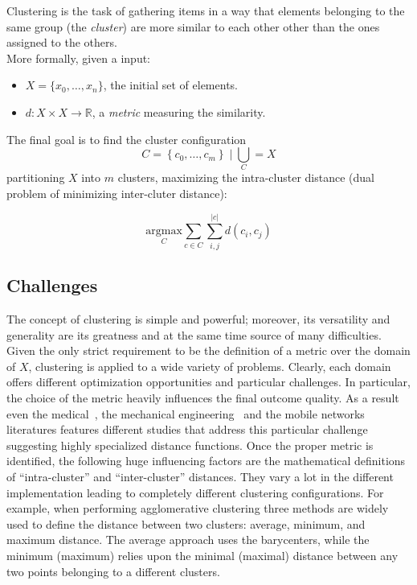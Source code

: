 \label{problem_definition}
Clustering is the task of gathering items in a way that elements belonging
to the same group (the \emph{cluster}) are more similar to each other other than the ones
assigned to the others.\\
More formally, given a input:
\begin{itemize}
    \item $X = \{x_0, \dots ,x_n\}$, the initial set of elements.
    \item $d: X \times X \to \mathbb{R}$, a \emph{metric} measuring the similarity.
\end{itemize}
The final goal is to find the cluster configuration
\begin{equation*}
    C = \left\{ c_0, \dots , c_m \right\} \mid \bigcup_{C} = X
\end{equation*}
partitioning $X$ into $m$ clusters, maximizing the intra-cluster distance
(dual problem of minimizing inter-cluter distance):

\begin{equation}
    \underset{C}{\mathrm{argmax}}
    \sum_{c \in C}
        \sum_{i,j}^{|c|}
            d(c_i,c_j)
\end{equation}


\subsection*{Challenges}
The concept of clustering is simple and powerful; moreover, its versatility
and generality are its greatness and at the same time source of many difficulties.
Given the only strict requirement to be the definition of a metric over the
domain of $X$, clustering is applied to a wide variety of problems.
Clearly, each domain offers different optimization opportunities and
particular challenges.
In particular, the choice of the metric heavily influences the final outcome quality.
As a result even the medical~\cite{siless2013comparison}, the mechanical
engineering~\cite{wilding2011clustering} and the mobile networks~\cite{cheng2009stability}
literatures features different studies that address this particular challenge
suggesting highly specialized distance functions.
Once the proper metric is identified, the following huge influencing factors
are the mathematical definitions of ``intra-cluster'' and ``inter-cluster''
distances. They vary a lot in the different implementation leading to
completely different clustering configurations.
For example, when performing agglomerative clustering three methods
are widely used to define the distance between two clusters:
average, minimum, and maximum distance.
The average approach uses the barycenters, while the minimum (maximum)
relies upon the minimal (maximal) distance between any two points
belonging to a different clusters.


